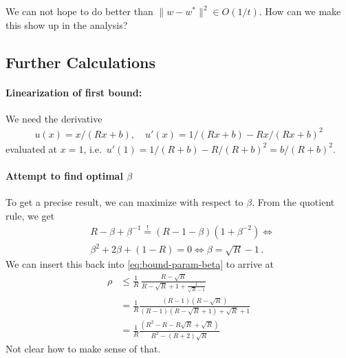 \documentclass{article}
\begin{document}
We can not hope to do better than $\| w - w^*\|^2 \in O(1/t)$. How can we make this show up in the analysis? 

\subsection{Further Calculations}

\paragraph{Linearization of first bound:}
We need the derivative
\begin{align}
u(x) = x/(Rx+b), \quad u'(x) = 1/(Rx+b) - Rx/(Rx+b)^2
\end{align}
evaluated at $x=1$, i.e.~$u'(1)= 1/(R+b) - R/(R+b)^2= b/(R+b)^2$.

\paragraph{Attempt to find optimal $\beta$}

To get a precise result, we can maximize with respect to $\beta$. From the quotient rule, we get 
\begin{align}
& R -\beta + \beta^{-1} \stackrel ! = (R-1-\beta)(1 + \beta^{-2}) \iff \\
& \beta^2 + 2\beta + (1-R) = 0  \iff   \beta = \sqrt{R} -1 \,.
\end{align}
We can insert this back into \eqref{eq:bound-param-beta} to arrive at 
\begin{align}
\rho & \le \frac 1R \, \frac{R-\sqrt R}{R - \sqrt R+1+\frac{1}{\sqrt{R}-1}} \\
& = \frac 1R \frac{(R-1) (R-\sqrt R)}{(R -1)(R - \sqrt R+1)+\sqrt R +1} \\
& = \frac 1R \frac{(R^2 -R -R\sqrt R+\sqrt R) }{R^2-(R+2) \sqrt R}
\end{align}
Not clear how to make sense of  that. 
\end{document}
